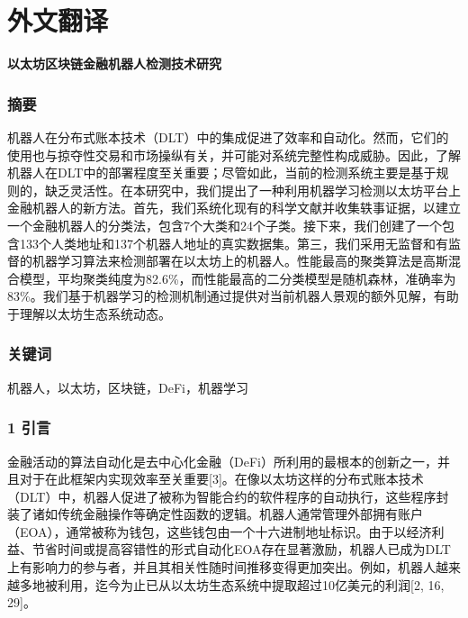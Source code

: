 \cleardoublepage

\newrefsection

\chapter{外文翻译}

\begin{center}
{\Large\bfseries 以太坊区块链金融机器人检测技术研究}
\end{center}

\subsection*{摘要}

机器人在分布式账本技术（DLT）中的集成促进了效率和自动化。然而，它们的使用也与掠夺性交易和市场操纵有关，并可能对系统完整性构成威胁。因此，了解机器人在DLT中的部署程度至关重要；尽管如此，当前的检测系统主要是基于规则的，缺乏灵活性。在本研究中，我们提出了一种利用机器学习检测以太坊平台上金融机器人的新方法。首先，我们系统化现有的科学文献并收集轶事证据，以建立一个金融机器人的分类法，包含7个大类和24个子类。接下来，我们创建了一个包含133个人类地址和137个机器人地址的真实数据集。第三，我们采用无监督和有监督的机器学习算法来检测部署在以太坊上的机器人。性能最高的聚类算法是高斯混合模型，平均聚类纯度为82.6\%，而性能最高的二分类模型是随机森林，准确率为83\%。我们基于机器学习的检测机制通过提供对当前机器人景观的额外见解，有助于理解以太坊生态系统动态。

\subsection*{关键词}

机器人，以太坊，区块链，DeFi，机器学习

\subsection*{1 引言}

金融活动的算法自动化是去中心化金融（DeFi）所利用的最根本的创新之一，并且对于在此框架内实现效率至关重要[3]。在像以太坊这样的分布式账本技术（DLT）中，机器人促进了被称为智能合约的软件程序的自动执行，这些程序封装了诸如传统金融操作等确定性函数的逻辑。机器人通常管理外部拥有账户（EOA），通常被称为钱包，这些钱包由一个十六进制地址标识。由于以经济利益、节省时间或提高容错性的形式自动化EOA存在显著激励，机器人已成为DLT上有影响力的参与者，并且其相关性随时间推移变得更加突出。例如，机器人越来越多地被利用，迄今为止已从以太坊生态系统中提取超过10亿美元的利润[2, 16, 29]。

